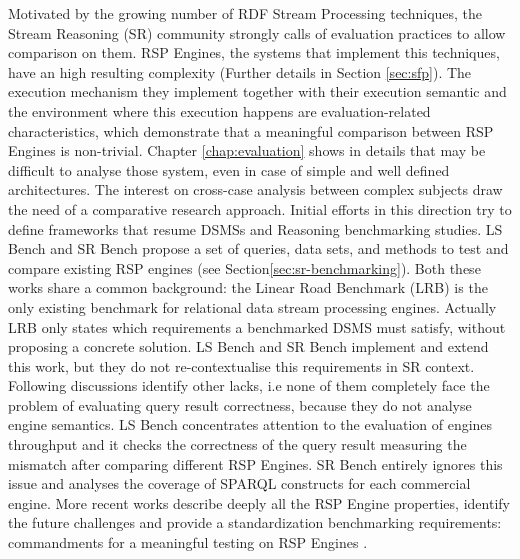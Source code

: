 Motivated by the growing number of RDF Stream Processing techniques, the Stream Reasoning (SR) community strongly calls of evaluation practices to allow comparison on them. RSP Engines, the systems that implement this techniques, have an high resulting complexity (Further details in Section \ref{sec:sfp}). The execution mechanism they implement together with their execution semantic and the environment where this execution happens are evaluation-related characteristics, which demonstrate that a meaningful comparison between RSP Engines is non-trivial. Chapter 	\ref{chap:evaluation} shows in details that may be difficult to analyse those system, even in case of simple and well defined architectures. 
The interest on cross-case analysis between complex subjects draw the need of a comparative research approach. Initial efforts in this direction try to define frameworks that resume  DSMSs \cite{arasu2004linear} and Reasoning \cite{Guo2005} benchmarking studies. LS Bench and SR Bench propose a set of queries, data sets, and methods to test and compare existing RSP engines (see Section\ref{sec:sr-benchmarking}). Both these works share a common background: the Linear Road Benchmark (LRB) is the only existing benchmark for relational data stream processing engines. Actually LRB only states which requirements a benchmarked DSMS must satisfy, without proposing a concrete solution. LS Bench and SR Bench implement and extend this work, but they do not re-contextualise this requirements in SR context. Following discussions identify other lacks, i.e none of them completely face the problem of evaluating query result correctness, because they do not analyse engine semantics. LS Bench concentrates attention to the evaluation of engines throughput and it checks the correctness of the query result measuring the mismatch after comparing different RSP Engines. SR Bench entirely ignores this issue and analyses the coverage of SPARQL constructs for each commercial engine. More recent works describe deeply all the RSP Engine properties, identify the future challenges and provide a standardization benchmarking requirements: commandments for a meaningful testing on RSP Engines \cite{DBLP:conf/esws/ScharrenbachUMVB13}.

